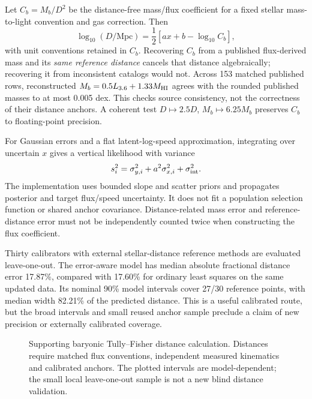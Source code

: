 \documentclass[10pt]{article}
\begin{document}
Let $C_b=M_b/D^2$ be the distance-free mass/flux coefficient for a fixed
stellar mass-to-light convention and gas correction. Then
\begin{equation}
 \log_{10}(D/\mathrm{Mpc})=
 \frac12[a x+b-\log_{10}C_b],
\end{equation}
with unit conventions retained in $C_b$. Recovering $C_b$ from a published
flux-derived mass and its \emph{same reference distance} cancels that distance
algebraically; recovering it from inconsistent catalogs would not. Across
153 matched published rows, reconstructed
$M_b=0.5L_{3.6}+1.33M_{\rm HI}$ agrees with the rounded published masses to
at most 0.005 dex. This checks source consistency, not the correctness of
their distance anchors. A coherent test $D\mapsto2.5D$, $M_b\mapsto6.25M_b$
preserves $C_b$ to floating-point precision.

For Gaussian errors and a flat latent-log-speed approximation, integrating
over uncertain $x$ gives a vertical likelihood with variance
\begin{equation}
 s_i^2=\sigma_{y,i}^2+a^2\sigma_{x,i}^2+\sigma_{\rm int}^2.
\end{equation}
The implementation uses bounded slope and scatter priors and propagates
posterior and target flux/speed uncertainty. It does not fit a population
selection function or shared anchor covariance. Distance-related mass error
and reference-distance error must not be independently counted twice when
constructing the flux coefficient.

Thirty calibrators with external stellar-distance reference methods are
evaluated leave-one-out. The
error-aware model has median absolute fractional distance error 17.87\%,
compared with 17.60\% for ordinary least squares on the same updated data.
Its nominal 90\% model intervals cover 27/30 reference points, with median
width 82.21\% of the predicted distance. This is a useful calibrated route,
but the broad intervals and small reused anchor sample preclude a claim of
new precision or externally calibrated coverage.

\begin{figure}[tb]
\centering{}
\caption{Supporting baryonic Tully--Fisher distance calculation. Distances
require matched flux conventions, independent measured kinematics and calibrated
anchors. The plotted intervals are model-dependent; the small local
leave-one-out sample is not a new blind distance validation.}
\end{figure}
\end{document}
